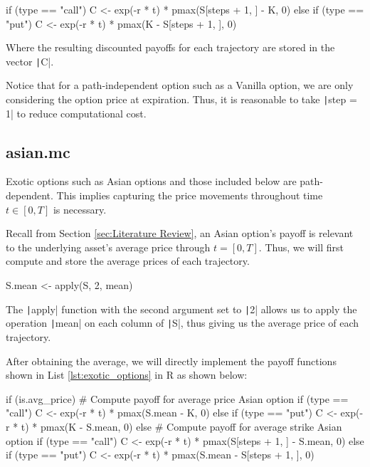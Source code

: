 \begin{Rminted}
if (type == "call") {
    C <- exp(-r * t) * pmax(S[steps + 1, ] - K, 0)
} else if (type == "put") {
    C <- exp(-r * t) * pmax(K - S[steps + 1, ], 0)
}
\end{Rminted}

Where the resulting discounted payoffs for each trajectory are stored in the vector \texttt|C|.

Notice that for a path-independent option such as a Vanilla option, we are only considering the option price at expiration. Thus, it is reasonable to take \texttt|step = 1| to reduce computational cost.

\subsection{asian.mc}

Exotic options such as Asian options and those included below are path-dependent. This implies capturing the price movements throughout time $t\in[0,T]$ is necessary.

Recall from Section \ref{sec:Literature Review}, an Asian option's payoff is relevant to the underlying asset's average price through $t=[0,T]$. Thus, we will first compute and store the average prices of each trajectory.

\begin{Rminted}
S.mean <- apply(S, 2, mean)
\end{Rminted}

The \texttt|apply| function with the second argument set to \texttt|2| allows us to apply the operation \texttt|mean| on each column of \texttt|S|, thus giving us the average price of each trajectory.

After obtaining the average, we will directly implement the payoff functions shown in List \ref{lst:exotic_options} in R as shown below:

\begin{Rminted}
if (is.avg_price) { # Compute payoff for average price Asian option
    if (type == "call") {
        C <- exp(-r * t) * pmax(S.mean - K, 0)
    } else if (type == "put") {
        C <- exp(-r * t) * pmax(K - S.mean, 0)
    }
} else { # Compute payoff for average strike Asian option
    if (type == "call") {
        C <- exp(-r * t) * pmax(S[steps + 1, ] - S.mean, 0)
    } else if (type == "put") {
        C <- exp(-r * t) * pmax(S.mean - S[steps + 1, ], 0)
    }
}
\end{Rminted}

